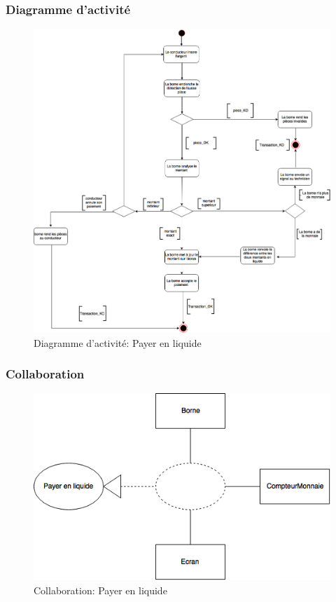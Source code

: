 \subsubsection{Diagramme d'activité}
\begin{figure}[h]
    \centering
    \includegraphics[scale=0.4]{02_Desenvolvimento/TD2/images/DAPayeLiquide.png}
    \caption{Diagramme d'activité: Payer en liquide}
\end{figure}
\newpage
\subsubsection{Collaboration}
\begin{figure}[h]
    \centering
    \includegraphics[scale=0.55]{02_Desenvolvimento/TD2/images/ColaLiquide.png}
    \caption{Collaboration: Payer en liquide}
\end{figure}
\newpage    
